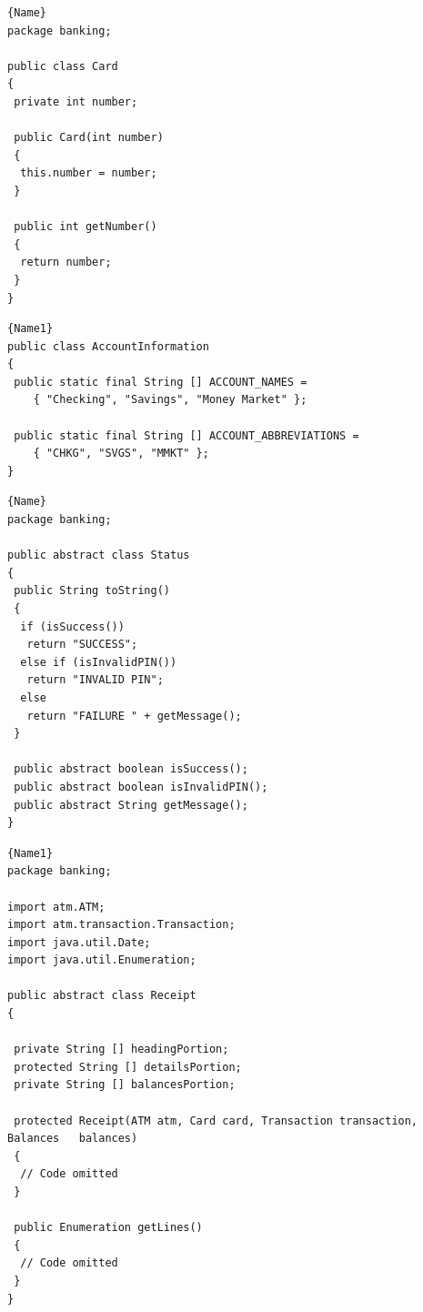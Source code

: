 \noindent\begin{minipage}{.45\textwidth}
\begin{lstlisting}[style=java,caption=Card.java,label=lst:CardJava]{Name}
package banking;

public class Card
{
 private int number;
    
 public Card(int number)
 {
  this.number = number;
 }
    
 public int getNumber()
 {
  return number;
 }   
}
\end{lstlisting}
\end{minipage}\hfill
\begin{minipage}{.45\textwidth}
\begin{lstlisting}[style=java,caption=AccountInfo.java,label=lst:AccountInformation]{Name1}
public class AccountInformation
{
 public static final String [] ACCOUNT_NAMES =
    { "Checking", "Savings", "Money Market" };
         
 public static final String [] ACCOUNT_ABBREVIATIONS =
    { "CHKG", "SVGS", "MMKT" };
}    
\end{lstlisting}
\end{minipage}


\noindent\begin{minipage}{.45\textwidth}
\begin{lstlisting}[style=java,caption=Status.java,label=lst:Status]{Name}
package banking;

public abstract class Status
{
 public String toString()
 {
  if (isSuccess())
   return "SUCCESS";
  else if (isInvalidPIN())
   return "INVALID PIN";
  else
   return "FAILURE " + getMessage();
 }
    
 public abstract boolean isSuccess();
 public abstract boolean isInvalidPIN();
 public abstract String getMessage();
}
\end{lstlisting}
\end{minipage}\hfill
\begin{minipage}{.45\textwidth}
\begin{lstlisting}[style=java,caption=Receipt.java,label=lst:Receipt]{Name1}
package banking;

import atm.ATM;
import atm.transaction.Transaction;
import java.util.Date;
import java.util.Enumeration;

public abstract class Receipt
{

 private String [] headingPortion;
 protected String [] detailsPortion;
 private String [] balancesPortion;  
    
 protected Receipt(ATM atm, Card card, Transaction transaction, Balances   balances)
 {        
  // Code omitted
 }
     
 public Enumeration getLines()
 {
  // Code omitted
 }
}
\end{lstlisting}
\end{minipage}

